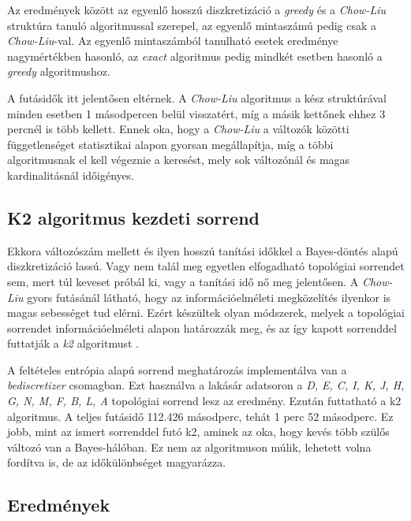 Az eredmények között az egyenlő hosszú diszkretizáció a \emph{greedy} és a \emph{Chow-Liu} struktúra tanuló algoritmussal szerepel, az egyenlő mintaszámú pedig csak a \emph{Chow-Liu}-val. Az egyenlő mintaszámból tanulható esetek eredménye nagymértékben hasonló, az \emph{exact} algoritmus pedig mindkét esetben hasonló a \emph{greedy} algoritmushoz.

A futásidők itt jelentősen eltérnek. A \emph{Chow-Liu} algoritmus a kész struktúrával minden esetben 1 másodpercen belül visszatért, míg a másik kettőnek ehhez 3 percnél is több kellett. Ennek oka, hogy a \emph{Chow-Liu} a változók közötti függetlenséget statisztikai alapon gyorsan megállapítja, míg a többi algoritmusnak el kell végeznie a keresést, mely sok változónál és magas kardinalitásnál időigényes.

\subsection{K2 algoritmus kezdeti sorrend}
Ekkora változószám mellett és ilyen hosszú tanítási időkkel a Bayes-döntés alapú diszkretizáció lassú. Vagy nem talál meg egyetlen elfogadható topológiai sorrendet sem, mert túl keveset próbál ki, vagy a tanítási idő nő meg jelentősen. A \emph{Chow-Liu} gyors futásánál látható, hogy az információelméleti megközelítés ilyenkor is magas sebességet tud elérni. Ezért készültek olyan módszerek, melyek a topológiai sorrendet információelméleti alapon határozzák meg, és az így kapott sorrenddel futtatják a \emph{k2} algoritmust \cite{aghdam2019some}.

A feltételes entrópia alapú sorrend meghatározás implementálva van a \emph{bediscretizer} csomagban. Ezt használva a lakásár adatsoron a \emph{D, E, C, I, K, J, H, G, N, M, F, B, L, A} topológiai sorrend lesz az eredmény. Ezután futtatható a k2 algoritmus. A teljes futásidő 112.426 másodperc, tehát 1 perc 52 másodperc. Ez jobb, mint az ismert sorrenddel futó k2, aminek az oka, hogy kevés több szülős változó van a Bayes-hálóban. Ez nem az algoritmuson múlik, lehetett volna fordítva is, de az időkülönbséget magyarázza.

\subsection{Eredmények}

